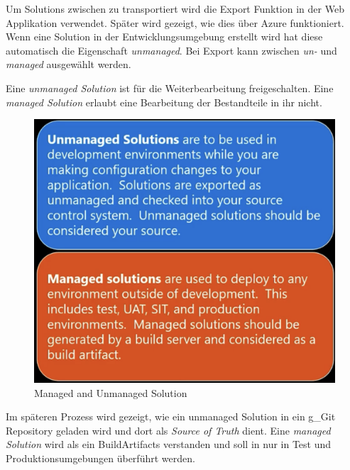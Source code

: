 Um Solutions zwischen \Envs zu transportiert wird die Export Funktion in der Web Applikation verwendet. Später wird gezeigt, wie dies über Azure funktioniert.
Wenn eine Solution in der Entwicklungsumgebung erstellt wird hat diese automatisch die Eigenschaft \textit{unmanaged}. Bei Export kann zwischen \textit{un-} und \textit{managed} ausgewählt werden. 

Eine \textit{unmanaged Solution} ist für die Weiterbearbeitung freigeschalten. Eine \textit{managed Solution} erlaubt eine Bearbeitung der Bestandteile in ihr nicht.
\begin{figure}[H]
	\centering
	\includegraphics[scale = 0.3]{attachment/chapter_13/Scc029}
	\caption{Managed and Unmanaged Solution} 
\end{figure}

Im späteren Prozess wird gezeigt, wie ein unmanaged Solution in ein \gls{g_Git} Repository geladen wird und dort als \textit{Source of Truth} dient.
Eine \textit{managed Solution} wird als ein \gls{BuildArtifacts} verstanden und soll in nur in Test und Produktionsumgebungen überführt werden.

